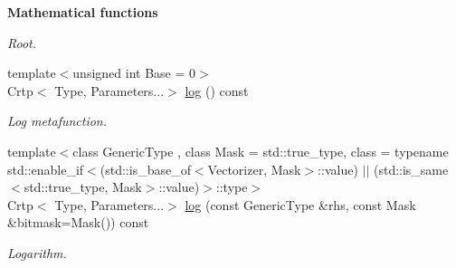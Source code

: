 \begin{Indent}{\bf Mathematical functions}
\begin{DoxyCompactItemize}
\begin{DoxyCompactList}\small\item\em Root. \end{DoxyCompactList}\item 
{\footnotesize template$<$unsigned int Base = 0$>$ }\\Crtp$<$ Type, Parameters...$>$ \hyperlink{classmagrathea_1_1AbstractNArray_ada2bf3966f9fbc9d0767f36422d4be14}{log} () const 
\begin{DoxyCompactList}\small\item\em Log metafunction. \end{DoxyCompactList}\item 
{\footnotesize template$<$class Generic\-Type , class Mask  = std\-::true\-\_\-type, class  = typename std\-::enable\-\_\-if$<$(std\-::is\-\_\-base\-\_\-of$<$\-Vectorizer, Mask$>$\-::value) $|$$|$ (std\-::is\-\_\-same$<$std\-::true\-\_\-type, Mask$>$\-::value)$>$\-::type$>$ }\\Crtp$<$ Type, Parameters...$>$ \hyperlink{classmagrathea_1_1AbstractNArray_a5c8629cb10f4a247997b1b048f39fd01}{log} (const Generic\-Type \&rhs, const Mask \&bitmask=Mask()) const 
\begin{DoxyCompactList}\small\item\em Logarithm. \end{DoxyCompactList}\end{DoxyCompactItemize}
\end{Indent}
